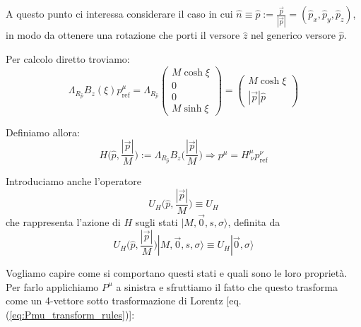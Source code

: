 \documentclass[../main.tex]{subfiles}
\begin{document}
A questo punto ci interessa considerare il caso in cui \(\hat{n} \equiv \hat{p} := \frac{\Vec{p}}{|\Vec{p}|} = (\hat p_x, \hat p_y, \hat p_z)\), in modo da ottenere una rotazione che porti il versore $\hat z$ nel generico versore $\hat{p}$.

Per calcolo diretto troviamo:
\[
\Lambda_{R_{\hat{p}}}B_z(\xi)p_\text{ref}^\mu = \Lambda_{R_{\hat{p}}}\begin{pmatrix}M\cosh\xi\\     0    \\     0    \\ M\sinh\xi \end{pmatrix} = \begin{pmatrix}M\cosh\xi  \\ |\Vec{p}|\hat{p}  \end{pmatrix}
\]

Definiamo allora:
\[
\boxed{H\bigg(\hat{p}, \frac{|\Vec{p}|}{M}\bigg) := \Lambda_{R_{\hat{p}}}B_z\bigg(\frac{|\Vec{p}|}{M}\bigg)} \Rightarrow \boxed{p^\mu = H^\mu_{~\nu} p^\nu_\text{ref}}
\]

Introduciamo anche l'operatore \[\boxed{U_H\bigg(\hat{p}, \frac{|\Vec{p}|}{M}\bigg) \equiv U_H}\] che rappresenta l'azione di $H$ sugli stati $|M, \Vec{0}, s, \sigma\rangle$, definita da 
\[
U_H\bigg(\hat{p}, \frac{|\Vec{p}|}{M}\bigg)|M, \Vec{0}, s, \sigma\rangle \equiv U_H| \Vec{0}, \sigma\rangle
\]

Vogliamo capire come si comportano questi stati e quali sono le loro proprietà. Per farlo applichiamo $P^\mu$ a sinistra e sfruttiamo il fatto che questo trasforma come un 4-vettore sotto trasformazione di Lorentz [eq. (\ref{eq:Pmu_transform_rules})]:
\end{document}

